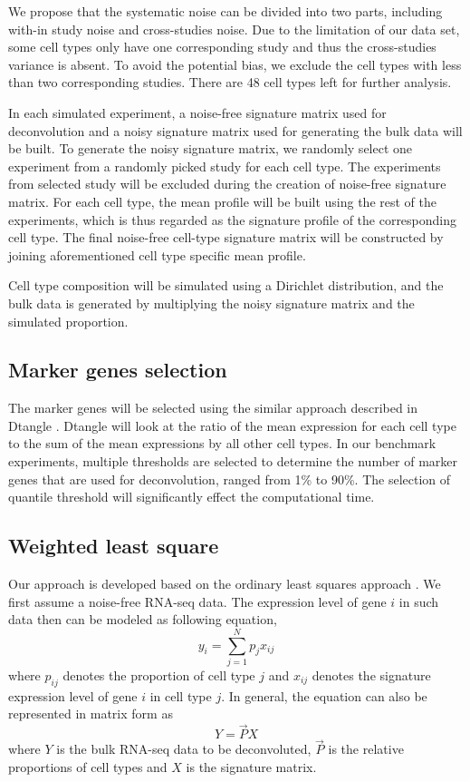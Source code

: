\documentclass[10pt, a4paper, oneside]{article}
\begin{document}
We propose that the systematic noise can be divided into two parts, including with-in study noise and cross-studies noise.
Due to the limitation of our data set, some cell types only have one corresponding study and thus 
the cross-studies variance is absent. To avoid the potential bias,
we exclude the cell types with less than two corresponding studies. There are 48 cell types left for further analysis.

In each simulated experiment, a noise-free signature matrix used for deconvolution and a noisy signature matrix used for
generating the bulk data will be built. To generate the noisy signature matrix, we randomly select one experiment from a randomly picked
study for each cell type. The experiments from selected study will be excluded during the creation of noise-free signature matrix.
For each cell type, the mean profile will be built using the rest of the experiments, which is thus regarded as the 
signature profile of the corresponding cell type. The final noise-free cell-type signature matrix will be constructed by joining
aforementioned cell type specific mean profile.

Cell type composition will be simulated using a Dirichlet distribution, and the bulk data is generated by multiplying the
noisy signature matrix and the simulated proportion.

\subsection{Marker genes selection}
\justify 
The marker genes will be selected using the similar approach described in Dtangle \cite{hunt2019dtangle}.
Dtangle will look at the ratio of the mean expression for each cell type to the sum of the mean expressions by all other cell types.
In our benchmark experiments, multiple thresholds are selected to determine the number of marker genes that are used for deconvolution,
ranged from 1\% to 90\%.
The selection of quantile threshold will significantly effect the computational time.

\subsection{Weighted least square}
\justify
Our approach is developed based on the ordinary least squares approach \cite{gong2013deconrnaseq}. 
We first assume a noise-free RNA-seq data. The expression level of gene $i$ in such data
then can be modeled as following equation,
\begin{equation}
    y_{i} = \sum_{j=1}^N p_{j}x_{ij}
\end{equation}
where $p_{ij}$ denotes the proportion of cell type $j$ and $x_{ij}$ denotes the signature expression level of gene $i$ in cell type $j$.
In general, the equation can also be represented in matrix form as
\begin{equation}
    Y = \vec{P}X 
\end{equation}
where $Y$ is the bulk RNA-seq data to be deconvoluted, $\vec{P}$ is the relative proportions of cell types and $X$ is the signature matrix.
\end{document}
